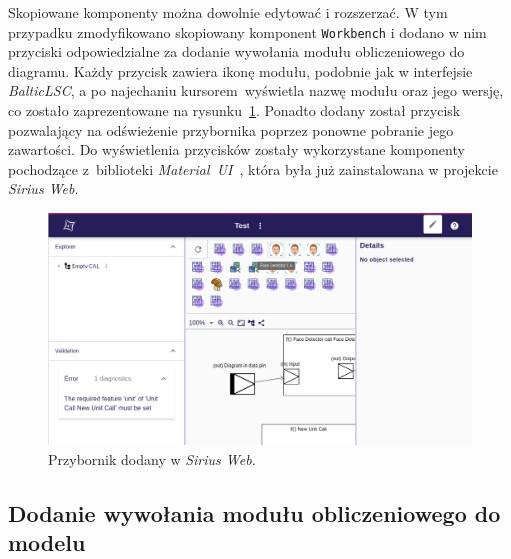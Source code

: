 Skopiowane komponenty można dowolnie edytować i rozszerzać. W tym przypadku
zmodyfikowano skopiowany komponent \texttt{Workbench} i dodano w nim
przyciski odpowiedzialne za dodanie wywołania modułu obliczeniowego do
diagramu. Każdy przycisk zawiera ikonę modułu, podobnie jak w interfejsie
\emph{BalticLSC}, a po najechaniu kursorem wyświetla nazwę modułu oraz jego
wersję, co zostało zaprezentowane na rysunku~\ref{rys:sirius-web-toolbox}.
Ponadto dodany został przycisk
pozwalający na odświeżenie przybornika poprzez ponowne pobranie jego
zawartości.
Do wyświetlenia przycisków zostały wykorzystane komponenty pochodzące
z~biblioteki \emph{Material~UI}~\cite{material-ui-homepage}, która była już
zainstalowana w projekcie \emph{Sirius Web}.

\begin{figure}[!ht]
	\centering

	\includegraphics[width=0.95\linewidth]{./images/sirius-web-toolbox.png}
	\caption{Przybornik dodany w \emph{Sirius
			Web}.}\label{rys:sirius-web-toolbox}
\end{figure}

\subsection{Dodanie wywołania modułu obliczeniowego do modelu}

%
%

